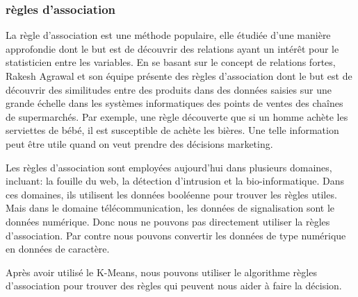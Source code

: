 \subsubsection{règles d'association}
La règle d'association est une méthode populaire, elle étudiée d'une manière approfondie dont le but est de découvrir des relations ayant un intérêt pour le statisticien entre les variables. En se basant sur le concept de relations fortes, Rakesh Agrawal et son équipe présente des règles d'association dont le but est de découvrir des similitudes entre des produits dans des données saisies sur une grande échelle dans les systèmes informatiques des points de ventes des chaînes de supermarchés. Par exemple, une règle découverte que si un homme achète les serviettes de bébé, il est susceptible de achète les bières. Une telle information peut être utile quand on veut prendre des décisions marketing.

Les règles d'association sont employées aujourd'hui dans plusieurs domaines, incluant: la fouille du web, la détection d'intrusion et la bio-informatique.  Dans ces domaines, ils utilisent les données booléenne pour trouver les règles utiles. Mais dans le domaine télécommunication, les données de signalisation sont le données numérique. Donc nous ne pouvons pas directement utiliser la règles d'association. Par contre nous pouvons convertir les données de type numérique en données de caractère.

 




Après avoir utilisé le K-Means, nous pouvons utiliser le algorithme règles d'association pour trouver des règles qui peuvent nous aider à faire la décision.

















